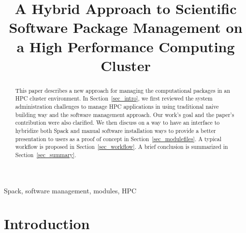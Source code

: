 \documentclass[conference]{IEEEtran}
\begin{document}
\title{A Hybrid Approach to Scientific Software Package Management on a High Performance Computing Cluster\\
}

\author{
\and
{}
}

\maketitle

\begin{abstract}
This paper describes a new approach for managing the computational packages in an HPC cluster environment.
In Section~\ref{sec_intro}, we first reviewed the system administration challenges to manage HPC applications in using traditional naive building way and the software management approach. Our work's goal and the paper's contribution were also clarified.
We then discuss on a way to have an interface to hybridize both Spack and manual software installation ways to provide a better presentation to users as a proof of concept in Section~\ref{sec_modulefiles}. A typical workflow is proposed in Section~\ref{sec_workflow}.  
A brief conclusion is summarized in Section~\ref{sec_summary}.

\end{abstract}

\begin{IEEEkeywords}
Spack, software management, modules, HPC 
\end{IEEEkeywords}

\section{Introduction}\label{sec_intro}
\end{document}

